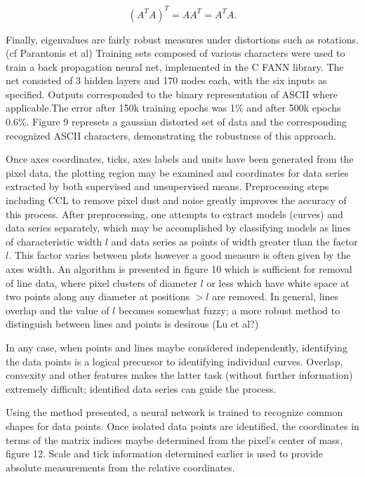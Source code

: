 \documentclass[12pt]{article}
\newcommand{\beq}{\begin{equation}}
\newcommand{\eeq}{\end{equation}}
\begin{document}
\beq  (A^TA)^T  =  AA^T = A^TA. \eeq

  Finally, eigenvalues are fairly robust measures under distortions such as rotations.(cf Parantonis et al) Training sets composed of various characters were used to train a back propagation neural net, implemented in the C FANN library. The net consisted of 3 hidden layers and 170 nodes each, with the six inputs as specified. Outputs corresponded to the binary representation of ASCII where applicable.The error after 150k training epochs was 1\% and after 500k epochs 0.6\%. Figure 9 represets a gaussian distorted set of data and the corresponding recognized ASCII characters, demonstrating the robustness of this approach.

Once axes coordinates, ticks, axes labels and units have been generated from the pixel data, the plotting region may be examined and coordinates for data series extracted by both supervised and unsupervised means. Preprocessing steps including CCL to remove pixel dust and noise greatly improves the accuracy of this process. After preprocessing, one  attempts to extract models (curves) and data series separately, which may be accomplished by classifying models as lines of characteristic width $l$ and data series as points of width greater than the factor $l$.  This factor varies between plots however a good measure is often given by the axes width. An algorithm is presented in figure 10 which is sufficient for removal of line data, where pixel clusters of diameter $l$ or less which have white space at two points along any diameter at positions  $>l$  are removed. In general, lines overlap and the value of  $l$ becomes somewhat fuzzy; a more robust method to distinguish between lines and points is desirous (Lu et al?)

In any case, when points and lines maybe considered independently, identifying the data points is a logical precursor to identifying individual curves. Overlap, convexity and other features makes the latter task (without further information) extremely difficult; identified data series can guide the process.

Using the method presented, a neural network is trained to recognize common shapes for data points. Once isolated data points are identified, the coordinates in terms of the matrix indices maybe determined from the pixel’s center of mass, figure 12. Scale and tick information determined earlier is used to provide absolute measurements from the relative coordinates.
 
\end{document}
